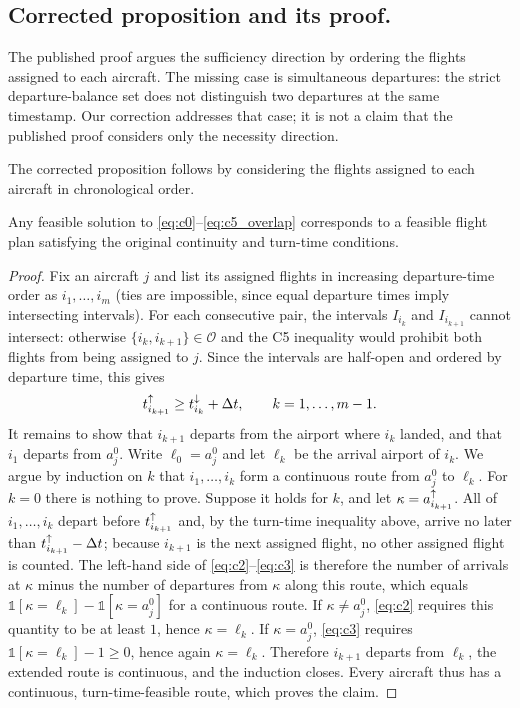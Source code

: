 \subsection{Corrected proposition and its proof.}

The published proof argues the sufficiency direction by ordering the flights
assigned to each aircraft. The missing case is simultaneous departures:
the strict departure-balance set does not distinguish two departures at the
same timestamp. Our correction addresses that case; it is not a claim that
the published proof considers only the necessity direction.


The corrected proposition follows by considering the flights assigned to each
aircraft in chronological order.

\begin{proposition}[Proposition~1]
  \label{prop:corrected_basic_feasibility}
  Any feasible solution to \eqref{eq:c0}--\eqref{eq:c5_overlap}
  corresponds to a feasible flight plan satisfying the original continuity and turn-time
  conditions.
\end{proposition}

\begin{proof}
Fix an aircraft $j$ and list its assigned flights in increasing departure-time
order as $i_1,\ldots,i_m$ (ties are impossible, since equal departure times
imply intersecting intervals). For each consecutive pair, the intervals
$I_{i_k}$ and $I_{i_{k+1}}$ cannot intersect: otherwise
$\{i_k,i_{k+1}\}\in\mathcal{O}$ and the C5 inequality would prohibit both
flights from being assigned to $j$. Since the intervals are half-open and
ordered by departure time, this gives
\[
  t^{\uparrow}_{i_{k+1}}\geq t^{\downarrow}_{i_k}+\Delta t,
  \qquad k=1,\ldots,m-1.
\]
It remains to show that $i_{k+1}$ departs from the airport where $i_k$ landed,
and that $i_1$ departs from $a^0_j$. Write $\ell_0=a^0_j$ and let $\ell_k$ be
the arrival airport of $i_k$. We argue by induction on $k$ that $i_1,\ldots,i_k$
form a continuous route from $a^0_j$ to $\ell_k$. For $k=0$ there is nothing to
prove. Suppose it holds for $k$, and let $\kappa=a^{\uparrow}_{i_{k+1}}$. All of
$i_1,\ldots,i_k$ depart before $t^{\uparrow}_{i_{k+1}}$ and, by the turn-time inequality
above, arrive no later than $t^{\uparrow}_{i_{k+1}}-\Delta t$; because $i_{k+1}$ is the next
assigned flight, no other assigned flight is counted. The left-hand side of
\eqref{eq:c2}--\eqref{eq:c3} is therefore the number of arrivals at $\kappa$
minus the number of departures from $\kappa$ along this route, which equals
$\mathbb{1}[\kappa=\ell_k]-\mathbb{1}[\kappa=a^0_j]$ for a continuous route.
If $\kappa\neq a^0_j$, \eqref{eq:c2} requires this quantity to be at least
$1$, hence $\kappa=\ell_k$. If $\kappa=a^0_j$, \eqref{eq:c3} requires
$\mathbb{1}[\kappa=\ell_k]-1\ge0$, hence again $\kappa=\ell_k$. Therefore
$i_{k+1}$ departs from $\ell_k$, the extended route is continuous, and the
induction closes. Every aircraft thus has a continuous, turn-time-feasible
route, which proves the claim.
\end{proof}







